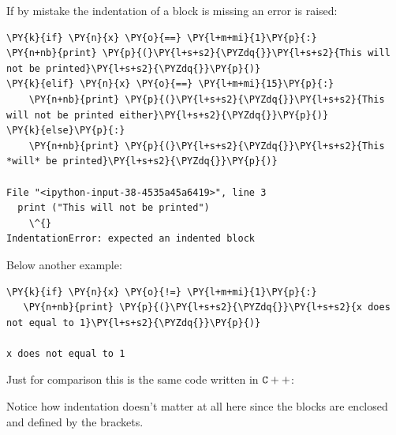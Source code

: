 If by mistake the indentation of a block is missing an error is raised:
\begin{codebox}[breakable, size=fbox, boxrule=1pt, pad at break*=1mm, colback=cellbackground, colframe=cellborder]            
\begin{Verbatim}[commandchars=\\\{\}]
\PY{k}{if} \PY{n}{x} \PY{o}{==} \PY{l+m+mi}{1}\PY{p}{:} 
\PY{n+nb}{print} \PY{p}{(}\PY{l+s+s2}{\PYZdq{}}\PY{l+s+s2}{This will not be printed}\PY{l+s+s2}{\PYZdq{}}\PY{p}{)}
\PY{k}{elif} \PY{n}{x} \PY{o}{==} \PY{l+m+mi}{15}\PY{p}{:}
    \PY{n+nb}{print} \PY{p}{(}\PY{l+s+s2}{\PYZdq{}}\PY{l+s+s2}{This will not be printed either}\PY{l+s+s2}{\PYZdq{}}\PY{p}{)}
\PY{k}{else}\PY{p}{:}
    \PY{n+nb}{print} \PY{p}{(}\PY{l+s+s2}{\PYZdq{}}\PY{l+s+s2}{This *will* be printed}\PY{l+s+s2}{\PYZdq{}}\PY{p}{)}

File "<ipython-input-38-4535a45a6419>", line 3
  print ("This will not be printed")
    \^{}
IndentationError: expected an indented block
\end{Verbatim}
\end{codebox}

Below another example:
\begin{codebox}[breakable, size=fbox, boxrule=1pt, pad at break*=1mm, colback=cellbackground, colframe=cellborder]            
\begin{Verbatim}[commandchars=\\\{\}]
\PY{k}{if} \PY{n}{x} \PY{o}{!=} \PY{l+m+mi}{1}\PY{p}{:}
   \PY{n+nb}{print} \PY{p}{(}\PY{l+s+s2}{\PYZdq{}}\PY{l+s+s2}{x does not equal to 1}\PY{l+s+s2}{\PYZdq{}}\PY{p}{)}

x does not equal to 1
\end{Verbatim}
\end{codebox}

Just for comparison this is the same code written in $\tt{C++}$:

\begin{Shaded}
\begin{Highlighting}[]
\NormalTok{) \{}
\NormalTok{);}
\NormalTok{\}}
 \NormalTok{) \{}
\NormalTok{);}
\NormalTok{\}}
\NormalTok{ \{}
\NormalTok{);}
\NormalTok{\}}
\end{Highlighting}
\end{Shaded}
Notice how indentation doesn't matter at all here since the blocks are enclosed and 
defined by the brackets.


